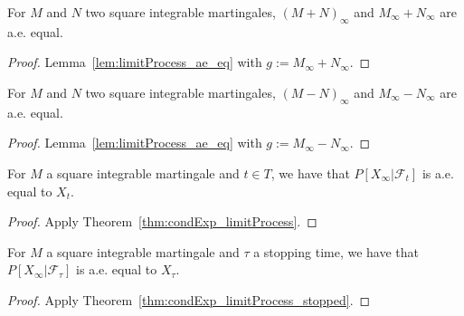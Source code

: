 \begin{lemma}\label{lem:IsSquareIntegrable.limitProcess_add}
  \leanok
For $M$ and $N$ two square integrable martingales, $(M + N)_\infty$ and $M_\infty + N_\infty$ are a.e. equal.
\end{lemma}

\begin{proof}
Lemma~\ref{lem:limitProcess_ae_eq} with $g := M_\infty + N_\infty$.
\end{proof}


\begin{lemma}\label{lem:IsSquareIntegrable.limitProcess_sub}
  \leanok
For $M$ and $N$ two square integrable martingales, $(M - N)_\infty$ and $M_\infty - N_\infty$ are a.e. equal.
\end{lemma}

\begin{proof}
Lemma~\ref{lem:limitProcess_ae_eq} with $g := M_\infty - N_\infty$.
\end{proof}


\begin{lemma}\label{lem:condExp_limitProcess}
  \leanok
  For $M$ a square integrable martingale and $t \in T$, we have that $P[X_\infty | \mathcal{F}_t]$ is a.e. equal to $X_t$.
\end{lemma}

\begin{proof}\leanok
  Apply Theorem~\ref{thm:condExp_limitProcess}.
\end{proof}


\begin{lemma}\label{lem:condExp_limitProcess_stopped}
  \leanok
  For $M$ a square integrable martingale and $\tau$ a stopping time, we have that $P[X_\infty | \mathcal{F}_\tau]$ is a.e. equal to $X_\tau$.
\end{lemma}

\begin{proof}\leanok
  Apply Theorem~\ref{thm:condExp_limitProcess_stopped}.
\end{proof}


